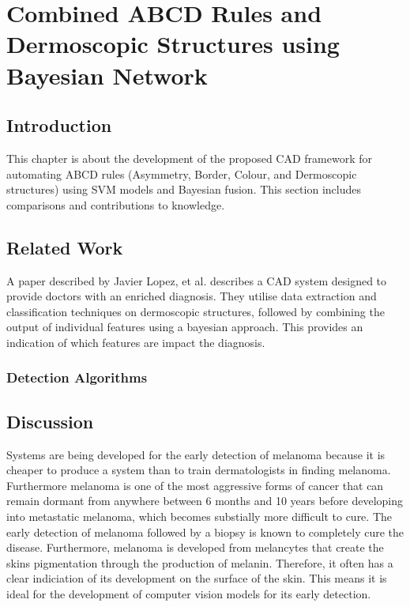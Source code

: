 \chapter{Combined ABCD Rules and Dermoscopic Structures using Bayesian Network}

\section{Introduction}
This chapter is about the development of the proposed CAD framework for automating ABCD rules (Asymmetry, Border, Colour, and Dermoscopic structures) using SVM models and Bayesian fusion. This section includes comparisons and contributions to knowledge.

\section{Related Work}
A paper described by Javier Lopez, et al.\cite{Lopez-Labraca2018} describes a CAD system designed to provide doctors with an enriched diagnosis. They utilise data extraction and classification techniques on dermoscopic structures, followed by combining the output of individual features using a bayesian approach. This provides an indication of which features are impact the diagnosis.

\subsection{Detection Algorithms}

\section{Discussion}
Systems are being developed for the early detection of melanoma because it is cheaper to produce a system than to train dermatologists in finding melanoma. Furthermore melanoma is one of the most aggressive forms of cancer that can remain dormant from anywhere between 6 months and 10 years before developing into metastatic melanoma, which becomes substially more difficult to cure\cite{UK2019}. The early detection of melanoma followed by a biopsy is known to completely cure the disease\cite{}. Furthermore, melanoma is developed from melancytes that create the skins pigmentation through the production of melanin. Therefore, it often has a clear indiciation of its development on the surface of the skin. This means it is ideal for the development of computer vision models for its early detection.

